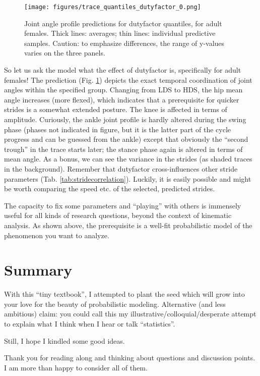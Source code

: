 \begin{figure}[p]
\centering
\texttt{[image: figures/trace\_quantiles\_dutyfactor\_0.png]}
\caption{\label{fig:dutyquantileprediction}Joint angle profile predictions for dutyfactor quantiles, for adult females. Thick lines: averages; thin lines: individual predictive samples. Caution: to emphasize differences, the range of y-values varies on the three panels.}
\end{figure}

So let us ask the model what the effect of dutyfactor is, specifically for adult females!
The prediction (Fig. \ref{fig:dutyquantileprediction}) depicts the exact temporal coordination of joint angles within the specified group.
Changing from LDS to HDS, the hip mean angle increases (more flexed), which indicates that a prerequisite for quicker strides is a somewhat extended posture.
The knee is affected in terms of amplitude.
Curiously, the ankle joint profile is hardly altered during the swing phase (phases not indicated in figure, but it is the latter part of the cycle progress and can be guessed from the ankle) except that obviously the ``second trough'' in the trace starts later; the stance phase again is altered in terms of mean angle.
As a bonus, we can see the variance in the strides (as shaded traces in the background).
Remember that dutyfactor cross-influences other stride parameters (Tab. \ref{tab:stridecorrelation}).
Luckily, it is easily possible and might be worth comparing the speed etc. of the selected, predicted strides.


The capacity to fix some parameters and ``playing'' with others is immensely useful for all kinds of research questions, beyond the context of kinematic analysis.
As shown above, the prerequisite is a well-fit probabilistic model of the phenomenon you want to analyze.



\FloatBarrier
\clearpage
\section{Summary}
\label{sec:org527d8db}
With this ``tiny textbook'', I attempted to plant the seed which will grow into your love for the beauty of probabilistic modeling.
Alternative (and less ambitious) claim: you could call this my illustrative/colloquial/desperate attempt to explain what I think when I hear or talk ``statistics''.

Still, I hope I kindled some good ideas.
\medskip

Thank you for reading along and thinking about questions and discussion points.
I am more than happy to consider all of them.



\FloatBarrier
\clearpage

\nocite{Gelman2013}

% 
% 
